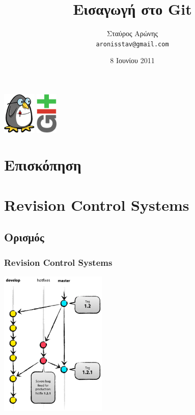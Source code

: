 \documentclass[handout]{beamer}
\title{Εισαγωγή στο Git}
\author[Σταύρος Αρώνης]{Σταύρος Αρώνης \\ \texttt{aronisstav@gmail.com}}
\date{8 Ιουνίου 2011}
\institute{Κοινότητα Ελεύθερου Λογισμικού ΕΜΠ}
\begin{document}
\begin{frame}
  \titlepage
  \begin{center}
    \includegraphics[height=2cm]{Fosstux.png}
    \hspace{1cm}
    \includegraphics[height=2cm]{git-logo.png}
  \end{center}
\end{frame}

\section*{Επισκόπηση}
\begin{frame}
  \tableofcontents[hidesubsections]
\end{frame}

\section{Revision Control Systems}

\subsection{Ορισμός}

\begin{frame}
  \frametitle{Revision Control Systems}
  \begin{center}
    \includegraphics[height=7cm]{hotfix-branches1.png}
  \end{center}
\end{frame}
\end{document}
